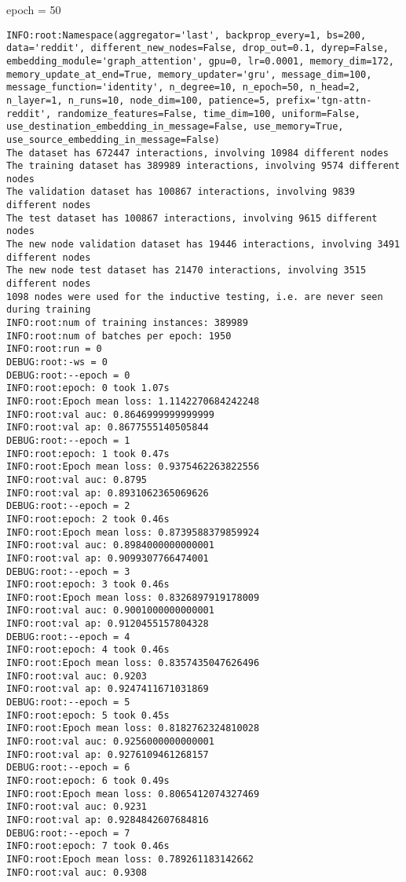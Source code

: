 \documentclass[11pt]{article}
\begin{document}
epoch = 50
\begin{verbatim}
INFO:root:Namespace(aggregator='last', backprop_every=1, bs=200, data='reddit', different_new_nodes=False, drop_out=0.1, dyrep=False, embedding_module='graph_attention', gpu=0, lr=0.0001, memory_dim=172, memory_update_at_end=True, memory_updater='gru', message_dim=100, message_function='identity', n_degree=10, n_epoch=50, n_head=2, n_layer=1, n_runs=10, node_dim=100, patience=5, prefix='tgn-attn-reddit', randomize_features=False, time_dim=100, uniform=False, use_destination_embedding_in_message=False, use_memory=True, use_source_embedding_in_message=False)
The dataset has 672447 interactions, involving 10984 different nodes
The training dataset has 389989 interactions, involving 9574 different nodes
The validation dataset has 100867 interactions, involving 9839 different nodes
The test dataset has 100867 interactions, involving 9615 different nodes
The new node validation dataset has 19446 interactions, involving 3491 different nodes
The new node test dataset has 21470 interactions, involving 3515 different nodes
1098 nodes were used for the inductive testing, i.e. are never seen during training
INFO:root:num of training instances: 389989
INFO:root:num of batches per epoch: 1950
INFO:root:run = 0
DEBUG:root:-ws = 0
DEBUG:root:--epoch = 0
INFO:root:epoch: 0 took 1.07s
INFO:root:Epoch mean loss: 1.1142270684242248
INFO:root:val auc: 0.8646999999999999
INFO:root:val ap: 0.8677555140505844
DEBUG:root:--epoch = 1
INFO:root:epoch: 1 took 0.47s
INFO:root:Epoch mean loss: 0.9375462263822556
INFO:root:val auc: 0.8795
INFO:root:val ap: 0.8931062365069626
DEBUG:root:--epoch = 2
INFO:root:epoch: 2 took 0.46s
INFO:root:Epoch mean loss: 0.8739588379859924
INFO:root:val auc: 0.8984000000000001
INFO:root:val ap: 0.9099307766474001
DEBUG:root:--epoch = 3
INFO:root:epoch: 3 took 0.46s
INFO:root:Epoch mean loss: 0.8326897919178009
INFO:root:val auc: 0.9001000000000001
INFO:root:val ap: 0.9120455157804328
DEBUG:root:--epoch = 4
INFO:root:epoch: 4 took 0.46s
INFO:root:Epoch mean loss: 0.8357435047626496
INFO:root:val auc: 0.9203
INFO:root:val ap: 0.9247411671031869
DEBUG:root:--epoch = 5
INFO:root:epoch: 5 took 0.45s
INFO:root:Epoch mean loss: 0.8182762324810028
INFO:root:val auc: 0.9256000000000001
INFO:root:val ap: 0.9276109461268157
DEBUG:root:--epoch = 6
INFO:root:epoch: 6 took 0.49s
INFO:root:Epoch mean loss: 0.8065412074327469
INFO:root:val auc: 0.9231
INFO:root:val ap: 0.9284842607684816
DEBUG:root:--epoch = 7
INFO:root:epoch: 7 took 0.46s
INFO:root:Epoch mean loss: 0.789261183142662
INFO:root:val auc: 0.9308

\end{verbatim}
\end{document}
